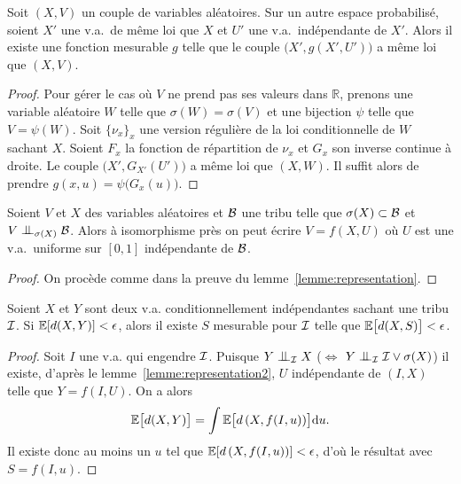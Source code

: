 \documentclass[12pt,a4paper]{article}
\begin{document}
\begin{appendices}
 
\begin{lemme}\label{lemme:representation}
Soit $(X,V)$ un couple de variables aléatoires.  
Sur un autre espace probabilisé, soient $X'$ une v.a.\ de même loi que 
$X$ et $U'$ une v.a.\ indépendante de $X'$. 
Alors il existe une fonction mesurable $g$ telle que le couple 
$\bigl(X', g(X',U')\bigr)$ a même loi que $(X,V)$. 
\end{lemme}

\begin{proof}
Pour gérer le cas où $V$ ne prend pas ses valeurs dans $\mathbb{R}$, prenons 
une variable aléatoire $W$ telle que $\sigma(W)=\sigma(V)$ et une bijection 
$\psi$ telle que $V=\psi(W)$. 
Soit $\{\nu_x\}_{x}$ une version régulière de la loi conditionnelle 
de $W$ sachant $X$. Soient $F_x$ la fonction de répartition de $\nu_x$ 
et $G_x$ son inverse continue à droite. 
Le couple $\bigl(X', G_{X'}(U')\bigr)$ a même loi que $(X,W)$. 
 Il suffit alors de prendre $g(x,u) = \psi\bigl(G_x(u)\bigr)$. 
\end{proof}



\begin{lemme}\label{lemme:representation2}
%  

Soient $V$ et $X$ des variables aléatoires et $\mathcal{B}$ une tribu telle que 
$\sigma(X) \subset \mathcal{B}$ et  $V \indep_{\sigma(X)} \BB$. 
Alors à isomorphisme près on peut écrire 
$V = f(X, U)$ où $U$ est une v.a.\ uniforme sur 
$[0,1]$ indépendante de $\mathcal{B}$. 
\end{lemme}

\begin{proof}
On procède comme dans la preuve du lemme~\ref{lemme:representation}. 
\end{proof}

\begin{lemme}\label{lemme:desintegr}
Soient $X$ et $Y$ sont deux v.a. conditionnellement indépendantes sachant une tribu $\mathcal{I}$. 
Si $\mathbb{E}[d(X,Y)] < \epsilon$, alors il existe $S$ mesurable pour $\mathcal{I}$ telle que $\mathbb{E}\bigl[d(X,S)\bigr] < \epsilon$.
\end{lemme}

\begin{proof}
Soit $I$  une v.a. qui engendre $\mathcal{I}$. Puisque 
$Y \indep_\II X$ ($\iff$ $Y \indep_{\II} \II \vee \sigma(X)$)
 il existe, d'après le lemme~\ref{lemme:representation2}, 
  $U$ indépendante de $(I,X)$ telle que $Y=f(I,U)$. On a alors 
$$
\mathbb{E}\bigl[d(X,Y)\bigr] = \int \mathbb{E}\bigl[d\left(X, f(I, u)\right)\bigr]\mathrm{d}u.
$$
Il existe donc au moins un $u$ tel que $\mathbb{E}[d\left(X, f(I, u)\right)] < \epsilon$, 
d'où le résultat avec $S=f(I,u)$. 
\end{proof}


\end{appendices}
\end{document}
